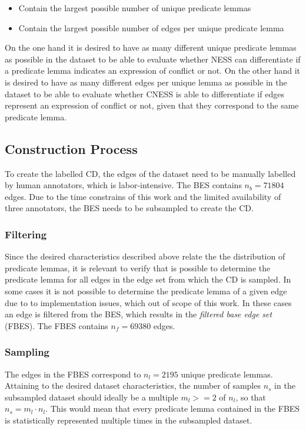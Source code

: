 \documentclass[11pt]{scrreprt}
\begin{document}
\begin{itemize}
	\item Contain the largest possible number of unique predicate lemmas
	\item Contain the largest possible number of edges per unique predicate lemma
\end{itemize}

On the one hand it is desired to have as many different unique predicate lemmas as possible in the dataset to be able to evaluate whether NESS can differentiate if a predicate lemma indicates an expression of conflict or not. On the other hand it is desired to have as many different edges per unique lemma as possible in the dataset to be able to evaluate whether CNESS is able to differentiate if edges represent an expression of conflict or not, given that they correspond to the same predicate lemma.

\subsection{Construction Process}
To create the labelled CD, the edges of the dataset need to be manually labelled by human annotators, which is labor-intensive. The BES contains \(n_b=71804\) edges. Due to the time constrains of this work and the limited availability of three annotators, the BES needs to be subsampled to create the CD. 

\subsubsection{Filtering}
Since the desired characteristics described above relate the the distribution of predicate lemmas, it is relevant to verify that is possible to determine the predicate lemma for all edges in the edge set from which the CD is sampled. In some cases it is not possible to determine the predicate lemma of a given edge due to to implementation issues, which out of scope of this work. In these cases an edge is filtered from the BES, which results in the \textit{filtered base edge set} (FBES). The FBES contains \(n_{f} = 69 380\) edges. 


\subsubsection{Sampling} 
The edges in the FBES correspond to \(n_{l} = 2195\) unique predicate lemmas. Attaining to the desired dataset characteristics, the number of samples \(n_{s}\) in the subsampled dataset should ideally be a multiple \(m_{l} >= 2\) of \(n_{l}\), so that \(n_{s} = m_{l} \cdot  n_{l}\). This would mean that every predicate lemma contained in the FBES is statistically represented multiple times in the subsampled dataset.
\end{document}
